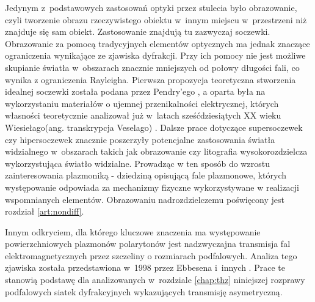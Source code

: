 
Jedynym z~podstawowych zastosowań optyki przez stulecia było obrazowanie, czyli tworzenie obrazu rzeczywistego obiektu w~innym miejscu w~przestrzeni niż znajduje się sam obiekt. Zastosowanie znajdują tu zazwyczaj soczewki. Obrazowanie za pomocą tradycyjnych elementów optycznych ma jednak znaczące ograniczenia wynikające ze zjawiska dyfrakcji. Przy ich pomocy nie jest możliwe skupianie światła w~obszarach znacznie mniejszych od połowy długości fali, co wynika z ograniczenia Rayleigha. Pierwsza propozycja teoretyczna stworzenia idealnej soczewki została podana przez Pendry'ego \cite{PhysRevLett.85.3966,loschialpo2003electromagnetic,smith2003limitations,ramakrishna2002asymmetric}, a oparta była na wykorzystaniu materiałów o ujemnej przenikalności elektrycznej, których własności teoretycznie analizował już w~latach sześćdziesiątych XX wieku Wiesiełago(ang. transkrypcja Veselago) \cite{veselago1968electrodynamics}. Dalsze prace dotyczące supersoczewek czy hipersoczewek \cite{liu2007far,jacob2006optical,jacob2007semiclassical,ma2010advances,rho2010spherical} znacznie poszerzyły potencjalne zastosowania światła widzialnego w~obszarach takich jak obrazowanie czy litografia wysokorozdzielcza wykorzystująca światło widzialne. Prowadząc w ten sposób do wzrostu zainteresowania plazmoniką - dziedziną opisującą fale plazmonowe, których występowanie odpowiada za mechanizmy fizyczne wykorzystywane w realizacji wspomnianych elementów. Obrazowaniu nadrozdzielczemu poświęcony jest rozdział \ref{art:nondiff}.

Innym odkryciem, dla którego kluczowe znaczenia ma występowanie powierzchniowych plazmonów polarytonów jest nadzwyczajna transmisja fal elektromagnetycznych przez szczeliny o rozmiarach podfalowych. Analiza tego zjawiska została przedstawiona w~1998 przez Ebbesena i~innych \cite{ebbesen1998extraordinary}. Prace te stanowią podstawę dla analizowanych w~rozdziale \ref{chap:thz} niniejszej rozprawy podfalowych siatek dyfrakcyjnych wykazujących transmisję asymetryczną.

